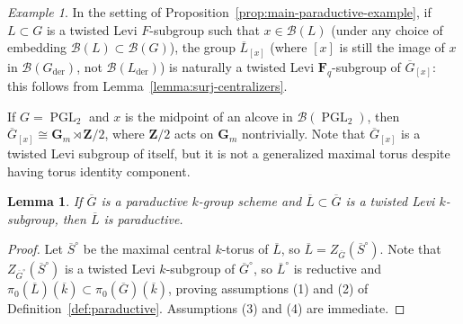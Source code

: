 \documentclass[reqno]{amsart}
\numberwithin{equation}{subsection}
\newcommand{\F}{\mathbf{F}}
\newcommand{\G}{\mathbf{G}}
\newcommand{\Z}{\mathbf{Z}}
\newcommand{\ol}[1]{\overline{#1}}
\newcommand\cB{\mathcal{B}}
\DeclareMathOperator{\PGL}{PGL}
\DeclareMathOperator{\der}{der}
\newtheorem{lemma}[thm]{Lemma}
\theoremstyle{remark}
\newtheorem{example}[thm]{Example}
\numberwithin{equation}{subsection}
\numberwithin{figure}{subsection}
\begin{document}
\begin{example}
    In the setting of Proposition~\ref{prop:main-paraductive-example}, if $L \subset G$ is a twisted Levi $F$-subgroup such that $x \in \cB(L)$ (under any choice of embedding $\cB(L) \subset \cB(G)$), the group $\ol L_{[x]}$ (where $[x]$ is still the image of $x$ in $\cB(G_{\der})$, not $\cB(L_{\der})$) is naturally a twisted Levi $\F_q$-subgroup of $\ol G_{[x]}$: this follows from Lemma~\ref{lemma:surj-centralizers}.
    
    If $G = \PGL_2$ and $x$ is the midpoint of an alcove in $\cB(\PGL_2)$, then $\ol G_{[x]} \cong \G_m \rtimes \Z/2$, where $\Z/2$ acts on $\G_m$ nontrivially. Note that $\ol G_{[x]}$ is a twisted Levi subgroup of itself, but it is not a generalized maximal torus despite having torus identity component.
\end{example}

\begin{lemma}\label{lemma:paraductive-permanence}
    If $\ol G$ is a paraductive $k$-group scheme and $\ol L \subset \ol G$ is a twisted Levi $k$-subgroup, then $\ol L$ is paraductive.
\end{lemma}

\begin{proof}
    Let $\ol S^\circ$ be the maximal central $k$-torus of $\ol L$, so $\ol L = Z_{\ol G}(\ol S^\circ)$. Note that $Z_{\ol G^\circ}(\ol S^\circ)$ is a twisted Levi $k$-subgroup of $\ol G^\circ$, so $\ol L^\circ$ is reductive and $\pi_0(\ol L)(\ol k) \subset \pi_0(\ol G)(\ol k)$, proving assumptions (1) and (2) of Definition~\ref{def:paraductive}. Assumptions (3) and (4) are immediate.
\end{proof}
\end{document}
